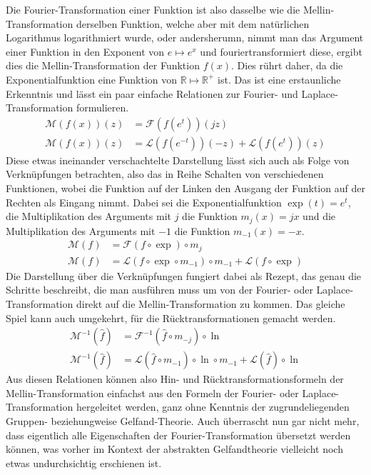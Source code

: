 Die Fourier-Transformation einer Funktion ist also dasselbe wie die 
Mellin-Transformation derselben Funktion, welche aber mit dem natürlichen 
Logarithmus logarithmiert wurde, oder andersherumn, nimmt man das 
Argument einer Funktion in den Exponent von $e \mapsto e^x$ und 
fouriertransformiert diese, ergibt dies die Mellin-Transformation 
der Funktion $f(x)$.
Dies rührt daher, da die Exponentialfunktion eine Funktion von 
$\mathbb{R} \mapsto \mathbb{R^+}$ ist.
Das ist eine erstaunliche Erkenntnis und lässt ein paar einfache 
Relationen zur Fourier- und Laplace-Transformation formulieren.
\begin{align*}
    \mathcal{M}\left(f(x)\right)(z) 
    &= \mathcal{F}\left(f (e^{t})\right)(jz) \\
    \mathcal{M}\left(f(x)\right)(z) 
    &= \mathcal{L}\left(f (e^{-t})\right)(-z) 
    + \mathcal{L}\left(f (e^{t})\right)(z) 
\end{align*}
Diese etwas ineinander verschachtelte Darstellung lässt sich auch als Folge von 
Verknüpfungen betrachten, also das in Reihe Schalten von verschiedenen 
Funktionen, wobei die Funktion auf der Linken den Ausgang der Funktion auf 
der Rechten als Eingang nimmt.
Dabei sei die Exponentialfunktion $\exp(t) = e^t$, die Multiplikation des 
Arguments mit $j$ die Funktion $m_j(x) = jx$ und die Multiplikation des 
Arguments mit $-1$ die Funktion $m_{-1}(x) = -x$.
\begin{align*}
    \mathcal{M}(f) 
    &= \mathcal{F}(f\circ\exp)\circ m_j \\
    \mathcal{M}(f) 
    &= \mathcal{L}(f\circ\exp\circ m_{-1})\circ m_{-1}
    + \mathcal{L}(f\circ\exp)
\end{align*}
Die Darstellung über die Verknüpfungen fungiert dabei als Rezept, das genau 
die Schritte beschreibt, die man ausführen muss um von der Fourier- oder 
Laplace-Transformation direkt auf die Mellin-Transformation zu kommen. 
Das gleiche Spiel kann auch umgekehrt, für die Rücktransformationen 
gemacht werden.
\begin{align*}
    \mathcal{M}^{-1}(\hat{f}) 
    &= \mathcal{F}^{-1}(\hat{f}\circ m_{-j})\circ\ln \\
    \mathcal{M}^{-1}(\hat{f}) 
    &= \mathcal{L}(\hat{f}\circ m_{-1})\circ\ln\circ m_{-1}
    + \mathcal{L}(\hat{f})\circ\ln
\end{align*}
Aus diesen Relationen können also Hin- und Rücktransformationsformeln 
der Mellin-Transformation einfachst aus den Formeln der Fourier- oder 
Laplace-Transformation hergeleitet werden, ganz ohne Kenntnis der 
zugrundeliegenden Gruppen- beziehungweise Gelfand-Theorie.
Auch überrascht nun gar nicht mehr, dass eigentlich alle Eigenschaften 
der Fourier-Transformation übersetzt werden können, was vorher im Kontext 
der abstrakten Gelfandtheorie vielleicht noch etwas undurchsichtig 
erschienen ist.

